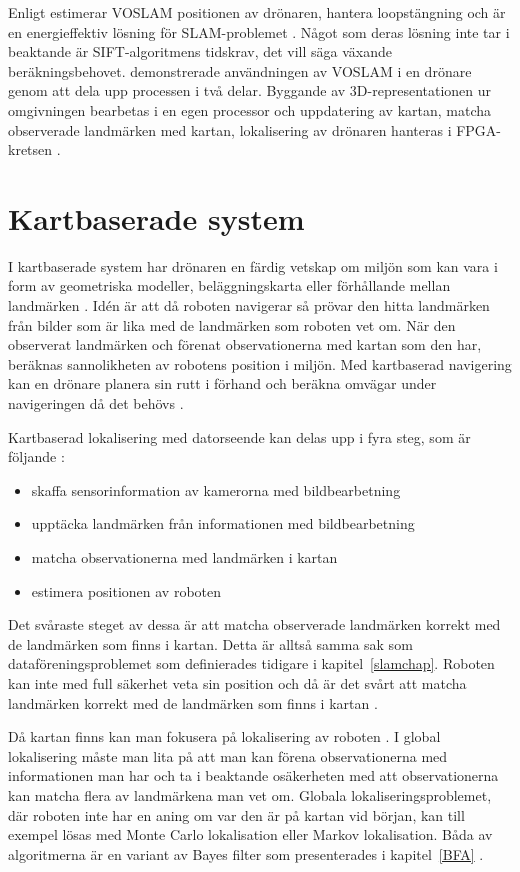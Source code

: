 Enligt \cite{voslam} estimerar VOSLAM positionen av drönaren, hantera loopstängning och är en energieffektiv lösning för SLAM-problemet \citep{voslam}. Något som deras lösning inte tar i beaktande är SIFT-algoritmens tidskrav, det vill säga växande beräkningsbehovet. \cite{voslamlatif} demonstrerade användningen av VOSLAM i en drönare genom att dela upp processen i två delar. Byggande av 3D-representationen ur omgivningen bearbetas i en egen processor och uppdatering av kartan, matcha observerade landmärken med kartan, lokalisering av drönaren hanteras i FPGA-kretsen \citep{voslamlatif}. 

\section{Kartbaserade system}

I kartbaserade system har drönaren en färdig vetskap om miljön som kan vara i form av geometriska modeller, beläggningskarta eller förhållande mellan landmärken \citep{982903}. Idén är att då roboten navigerar så prövar den hitta landmärken från bilder som är lika med de landmärken som roboten vet om. När den observerat landmärken och förenat observationerna med kartan som den har, beräknas sannolikheten av robotens position i miljön. Med kartbaserad navigering kan en drönare planera sin rutt i förhand och beräkna omvägar under navigeringen då det behövs \citep{geospatial}. 

Kartbaserad lokalisering med datorseende kan delas upp i fyra steg, som är följande \citep{982903}:

\begin{itemize}
    \item skaffa sensorinformation av kamerorna med bildbearbetning
    \item upptäcka landmärken från informationen med bildbearbetning
    \item matcha observationerna med landmärken i kartan
    \item estimera positionen av roboten
\end{itemize}

Det svåraste steget av dessa är att matcha observerade landmärken korrekt med de landmärken som finns i kartan. Detta är alltså samma sak som dataföreningsproblemet som definierades tidigare i kapitel~\ref{slamchap}. Roboten kan inte med full säkerhet veta sin position och då är det svårt att matcha landmärken korrekt med de landmärken som finns i kartan \citep{982903}.

Då kartan finns kan man fokusera på lokalisering av roboten \citep{982903}. I global lokalisering måste man lita på att man kan förena observationerna med informationen man har och ta i beaktande osäkerheten med att observationerna kan matcha flera av landmärkena man vet om. Globala lokaliseringsproblemet, där roboten inte har en aning om var den är på kartan vid början, kan till exempel lösas med Monte Carlo lokalisation eller Markov lokalisation. Båda av algoritmerna är en variant av Bayes filter som presenterades i kapitel~\ref{BFA} \citep{ProbabilisticRobotics}. 

